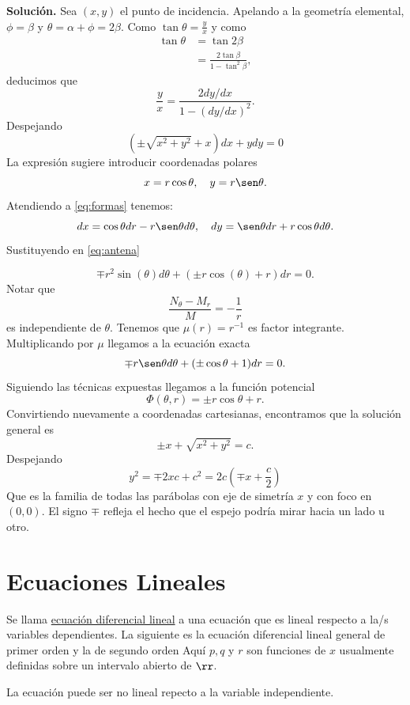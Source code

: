  \noindent\textbf{Solución.} Sea $(x,y)$ el punto de incidencia. Apelando a la geometría elemental, $\phi=\beta$ y $\theta=\alpha+\phi=2\beta$. Como $\tan\theta=\frac{y}{x}$
  y como
  \[\begin{split} \tan\theta &=\tan 2\beta\\&=\frac{2\tan\beta}{1-\tan^2\beta},
    \end{split}
\]
deducimos que
\[\frac{y}{x}=\frac{2 dy/dx}{1-(dy/dx)^2}.\]
Despejando
\begin{equation}\label{eq:antena}
 (\pm\sqrt{x^2+y^2}+x)dx+ydy=0
\end{equation}
La expresión sugiere introducir coordenadas polares
\[x=r\cos\theta, \quad y=r\sen\theta.\]
Atendiendo a \eqref{eq:formas} tenemos:
\[dx=\cos\theta dr-r\sen\theta d\theta,\quad dy=\sen\theta dr+r\cos\theta d\theta.\]
Sustituyendo en \eqref{eq:antena}

\[\mp r^{2} \sin{\left (\theta \right )} d\theta + \left(\pm r \cos{\left (\theta \right )} + r\right) dr=0.\]
Notar que
\[\frac{N_{\theta}-M_r}{M}=-\frac{1}{r}\]
es independiente de $\theta$. Tenemos que $\mu(r)=r^{-1}$ es factor integrante. Multiplicando por $\mu$ llegamos a la ecuación exacta
\[\mp r\sen\theta d\theta+(\pm\cos\theta+ 1)dr=0.\]
Siguiendo las técnicas expuestas llegamos a la función potencial
\[\Phi(\theta,r)=\pm r\cos\theta +r.\]
Convirtiendo nuevamente a coordenadas cartesianas, encontramos que la solución general es
\[\pm x + \sqrt{x^2+y^2}=c.\]
Despejando
\[y^2=\mp 2xc+c^2=2c\left(\mp x+\frac{c}{2}\right)\]
Que es la familia de todas las parábolas con eje de simetría $x$  y con foco en $(0,0)$. 
El signo $\mp$ refleja el hecho que el espejo podría mirar hacia un lado u otro. 

\section{Ecuaciones Lineales}
\begin{definicion} Se llama \href{http://es.wikipedia.org/wiki/Ecuación_diferencial_lineal}{ecuación diferencial lineal}\link
a una ecuación que es lineal
respecto a   la/s variables
dependientes. La siguiente es la ecuación diferencial lineal general de primer orden
y la  de segundo orden
Aquí $p,q$ y $r$ son funciones de $x$ usualmente definidas sobre un intervalo abierto de $\rr$.
\end{definicion}
La ecuación puede ser no lineal repecto a la variable independiente.

